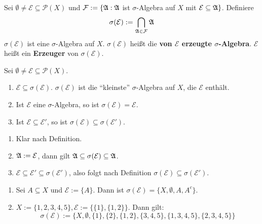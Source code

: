 \begin{definition}
    Sei $\emptyset \neq \mathcal{E} \subseteq \mathcal{P}(X)$ und 
    $\mathcal{F}:=\{\mathfrak{A}:\mathfrak{A}$ ist $\sigma$-Algebra auf $X$ mit 
    $\mathcal{E}\subseteq\mathfrak{A}\}$. Definiere
    \[\sigma(\mathcal{E}):=\bigcap_{\mathfrak{A}\in\mathcal{F}}\mathfrak{A}\]
     $\sigma(\mathcal{E})$ ist eine $\sigma$-Algebra 
    auf $X$. $\sigma(\mathcal{E})$ heißt die 
    \textbf{von $\mathcal{E}$ erzeugte $\sigma$-Algebra}. 
    $\mathcal{E}$ heißt ein \textbf{Erzeuger} von 
    $\sigma(\mathcal{E})$.
\end{definition}

\begin{lemma}
    \label{Lemma 1.3}
    Sei $\emptyset\ne\mathcal{E}\subseteq\mathcal{P}(X)$.
    \begin{enumerate}
        \item $\mathcal{E}\subseteq\sigma(\mathcal{E})$. 
              $\sigma(\mathcal{E})$ ist die "`kleinste"' 
              $\sigma$-Algebra auf $X$, die $\mathcal{E}$ enthält.
        \item Ist $\mathcal{E}$ eine $\sigma$-Algebra, so ist 
              $\sigma(\mathcal{E})=\mathcal{E}$.
        \item Ist $\mathcal{E}\subseteq\mathcal{E}'$, so ist 
              $\sigma(\mathcal{E})\subseteq\sigma(\mathcal{E}')$.
    \end{enumerate}
\end{lemma}

\begin{beweis}
    \begin{enumerate}
        \item Klar nach Definition.
        \item $\mathfrak{A}:=\mathcal{E}$, dann gilt 
              $\mathfrak{A}\subseteq\sigma(\mathcal{E})\subseteq\mathfrak{A}$.
        \item $\mathcal{E}\subseteq\mathcal{E}'\subseteq\sigma(\mathcal{E}')$, 
              also folgt nach Definition 
              $\sigma(\mathcal{E})\subseteq\sigma(\mathcal{E}')$.
    \end{enumerate}
\end{beweis}

\begin{beispiel}
    \begin{enumerate}
        \item Sei $A\subseteq X$ und $\mathcal{E}:=\{A\}$. Dann ist 
              $\sigma(\mathcal{E})=\{X,\emptyset,A,A^c\}$.
        \item $X:=\{1,2,3,4,5\}, \mathcal{E}:=\{\{1\},\{1,2\}\}$. 
              Dann gilt:
              \[\sigma(\mathcal{E}):=\{X,\emptyset, \{1\},\{2\},\{1,2\},\{3,4,5\},\{1,3,4,5\},\{2,3,4,5\}\}\]
    \end{enumerate}
\end{beispiel}

